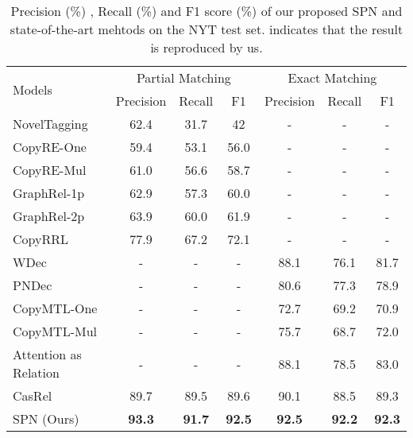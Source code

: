 \documentclass[letterpaper]{article} \usepackage{aaai21}  \usepackage{times}  \usepackage{helvet} \usepackage{courier}  \usepackage[hyphens]{url}  \usepackage{graphicx} \usepackage{amsfonts,amssymb}
\begin{document}
\begin{table*}[thbp]
\begin{center}
\begin{tabular}{l|ccc|ccc}
\hline
\multirow{2}{*}{Models}               & \multicolumn{3}{c|}{Partial Matching} & \multicolumn{3}{c}{Exact Matching} \\\cline{2-7}

                                      & Precision    & Recall    & F1     & Precision   & Recall   & F1     \\
                                      \hline\hline
NovelTagging \cite{zheng2017joint}     & 62.4         & 31.7      & 42     & -            &  -        &   -     \\
CopyRE-One \cite{zeng2018extracting}   & 59.4         & 53.1      & 56.0   &   -          &    -      &   -     \\
CopyRE-Mul\cite{zeng2018extracting} & 61.0         & 56.6      & 58.7   &  -           &     -     &    -    \\
GraphRel-1p \cite{fu2019graphrel}          & 62.9         & 57.3      & 60.0   & -            & -         &    -    \\
GraphRel-2p \cite{fu2019graphrel}            & 63.9         & 60.0      & 61.9   &        -     &      -    &      -  \\
CopyRRL \cite{zeng2019learning}          & 77.9         & 67.2      & 72.1   &           -  &    -      &   -     \\
WDec\cite{nayak2019ptrnetdecoding}     &   -           &  -         &  -                    &88.1         & 76.1      & 81.7        \\
PNDec\cite{nayak2019ptrnetdecoding} &   -           &  -         &  -                    &80.6         & 77.3      & 78.9        \\
CopyMTL-One \cite{zeng2020copymtl} &-&-&-&72.7 &69.2 &70.9 \\
CopyMTL-Mul \cite{zeng2020copymtl} &-   &- &- &  75.7 &68.7 &72.0 \\
Attention as Relation \cite{ijcai2020-524} &-&-&-&88.1& 78.5& 83.0\\
CasRel \cite{wei-etal-2020-novel}                        & 89.7         & 89.5      & 89.6   & 90.1       & 88.5    & 89.3 \\
\hline
    SPN (Ours)                                  & \textbf{93.3}         & \textbf{91.7}      & \textbf{92.5}   &  \textbf{92.5}           &   \textbf{92.2}       & \textbf{92.3}    \\  
\hline
\end{tabular}
\caption{Precision (\%) , Recall (\%)  and F1 score (\%) of our proposed SPN and state-of-the-art mehtods on the NYT test set.  indicates that the result is reproduced by us.}
\label{NYT_result}
\end{center}
\end{table*}
\end{document}
